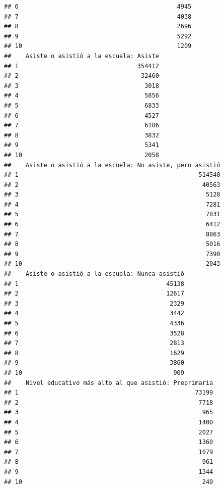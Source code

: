 \documentclass[11pt,]{article}
\begin{document}
\begin{verbatim}
## 6                                            4945
## 7                                            4038
## 8                                            2696
## 9                                            5292
## 10                                           1209
##    Asiste o asistió a la escuela: Asiste
## 1                                 354412
## 2                                  32460
## 3                                   3018
## 4                                   5856
## 5                                   6833
## 6                                   4527
## 7                                   6186
## 8                                   3832
## 9                                   5341
## 10                                  2058
##    Asiste o asistió a la escuela: No asiste, pero asistió
## 1                                                  514540
## 2                                                   40563
## 3                                                    5128
## 4                                                    7281
## 5                                                    7831
## 6                                                    6412
## 7                                                    8863
## 8                                                    5016
## 9                                                    7390
## 10                                                   2043
##    Asiste o asistió a la escuela: Nunca asistió
## 1                                         45138
## 2                                         12617
## 3                                          2329
## 4                                          3442
## 5                                          4336
## 6                                          3528
## 7                                          2813
## 8                                          1629
## 9                                          3860
## 10                                          909
##    Nivel educativo más alto al que asistió: Preprimaria
## 1                                                 73199
## 2                                                  7718
## 3                                                   965
## 4                                                  1400
## 5                                                  2027
## 6                                                  1360
## 7                                                  1079
## 8                                                   961
## 9                                                  1344
## 10                                                  240

\end{verbatim}
\end{document}
